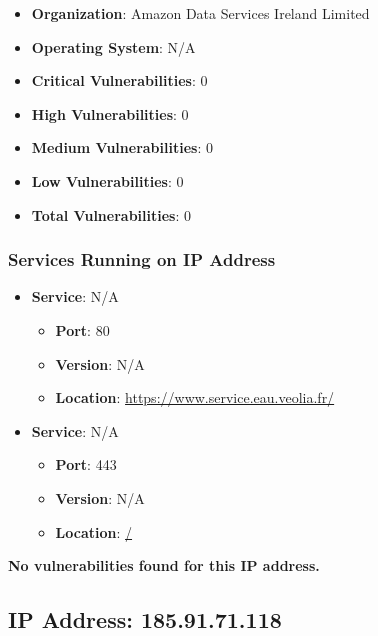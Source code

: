 \documentclass{article}
\begin{document}
\begin{itemize}
    \item \textbf{Organization}: Amazon Data Services Ireland Limited
    \item \textbf{Operating System}:  N/A 
    \item \textbf{Critical Vulnerabilities}: 0
    \item \textbf{High Vulnerabilities}: 0
    \item \textbf{Medium Vulnerabilities}: 0
    \item \textbf{Low Vulnerabilities}: 0
    \item \textbf{Total Vulnerabilities}: 0
\end{itemize}

\subsubsection*{Services Running on IP Address}

\begin{itemize}
    
        \item \textbf{Service}: N/A
        \begin{itemize}
            \item \textbf{Port}: 80
            \item \textbf{Version}:  N/A 
            \item \textbf{Location}: \href{ https://www.service.eau.veolia.fr/ }{ https://www.service.eau.veolia.fr/ }
        \end{itemize}
    
        \item \textbf{Service}: N/A
        \begin{itemize}
            \item \textbf{Port}: 443
            \item \textbf{Version}:  N/A 
            \item \textbf{Location}: \href{ / }{ / }
        \end{itemize}
    
\end{itemize}


\textbf{No vulnerabilities found for this IP address.}




\clearpage



\subsection{IP Address: 185.91.71.118}
\end{document}
